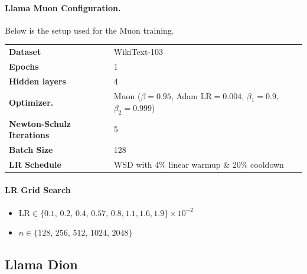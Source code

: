 \documentclass{article} %
\begin{document}
\paragraph{Llama Muon Configuration.}
Below is the setup used for the Muon training.  

\begin{table}[ht]
\centering
\small
\renewcommand{\arraystretch}{1.2}
\begin{tabular}{@{}ll@{}}
\toprule
\textbf{Dataset}       & WikiText-103                                        \\ 
\addlinespace
\textbf{Epochs}        & 1                                                   \\ 
\addlinespace
\textbf{Hidden layers} & 4                                                   \\ 
\addlinespace
\textbf{Optimizer.}     & Muon ($\beta=0.95$, Adam LR$=0.004$, $\beta_1 = 0.9$, $\beta_2 = 0.999$) \\ 
\addlinespace
\textbf{Newton-Schulz Iterations} & 5 \\
\addlinespace
\textbf{Batch Size} & 128 \\
\addlinespace
\textbf{LR Schedule}   & WSD with 4\% linear warmup \& 20\% cooldown         \\ 
\bottomrule
\end{tabular}
\end{table}

\paragraph{LR Grid Search}
\begin{itemize}[nosep,leftmargin=*]
  \item \(\displaystyle \mathrm{LR} \in \{0.1,\,0.2,\,0.4,\,0.57,\,0.8,1.1,1.6,1.9\}\times10^{-2}\)
  
  \vspace{2mm}
  
  \item \(n \in \{128,\,256,\,512,\,1024,\,2048\}\)
\end{itemize}


\subsection{Llama Dion}\label{app:llama_dion}
\end{document}
